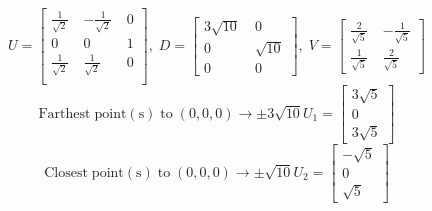 \documentclass[11pt]{article}
\begin{document}
\begin{preview}
\begin{enumerate}
            $$U = \begin{bmatrix}
                  \frac{1}{\sqrt{2}}\;&-\frac{1}{\sqrt{2}}\;&0\\
                  0\;&0\;&1\\
                  \frac{1}{\sqrt{2}}\;&\frac{1}{\sqrt{2}}\;&0\\
            \end{bmatrix}, \; D=\begin{bmatrix}
                  3\sqrt{10}\;&0\\
                  0\;&\sqrt{10}\\
                  0\;&0
            \end{bmatrix}, \; V=\begin{bmatrix}
                  \frac{2}{\sqrt{5}}\;&-\frac{1}{\sqrt{5}}\\
                  \frac{1}{\sqrt{5}}\;&\frac{2}{\sqrt{5}}
            \end{bmatrix}$$
            $$\mathrm{Farthest \; point(s) \; to \;} (0,0,0) \rightarrow \pm 3\sqrt{10} U_1 = \begin{bmatrix}3\sqrt{5}\\ 0\\ 3\sqrt{5}\end{bmatrix}$$
            $$\mathrm{Closest \; point(s) \; to \;} (0,0,0) \rightarrow \pm \sqrt{10} U_2 = \begin{bmatrix}-\sqrt{5}\\ 0\\ \sqrt{5}\end{bmatrix}$$

      \end{enumerate}


\end{preview}
\end{document}
